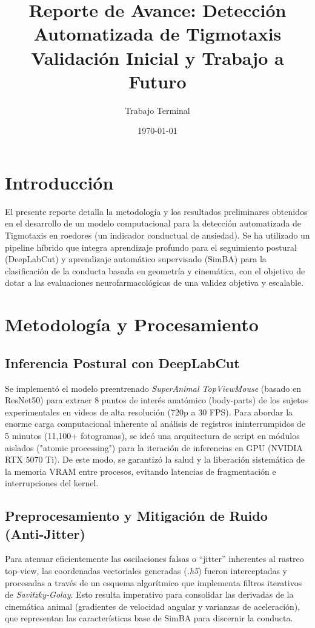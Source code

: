 \documentclass[12pt,a4paper]{article}
\title{Reporte de Avance: Detección Automatizada de Tigmotaxis \\ \large Validación Inicial y Trabajo a Futuro}
\author{Trabajo Terminal}
\date{\today}
\begin{document}
\maketitle

\section{Introducción}
El presente reporte detalla la metodología y los resultados preliminares obtenidos en el desarrollo de un modelo computacional para la detección automatizada de Tigmotaxis en roedores (un indicador conductual de ansiedad). Se ha utilizado un pipeline híbrido que integra aprendizaje profundo para el seguimiento postural (DeepLabCut) y aprendizaje automático supervisado (SimBA) para la clasificación de la conducta basada en geometría y cinemática, con el objetivo de dotar a las evaluaciones neurofarmacológicas de una validez objetiva y escalable.

\section{Metodología y Procesamiento}

\subsection{Inferencia Postural con DeepLabCut}
Se implementó el modelo preentrenado \textit{SuperAnimal TopViewMouse} (basado en ResNet50) para extraer 8 puntos de interés anatómico (body-parts) de los sujetos experimentales en videos de alta resolución (720p a 30 FPS). Para abordar la enorme carga computacional inherente al análisis de registros ininterrumpidos de 5 minutos (11,100+ fotogramas), se ideó una arquitectura de script en módulos aislados ("atomic processing") para la iteración de inferencias en GPU (NVIDIA RTX 5070 Ti). De este modo, se garantizó la salud y la liberación sistemática de la memoria VRAM entre procesos, evitando latencias de fragmentación e interrupciones del kernel.

\subsection{Preprocesamiento y Mitigación de Ruido (Anti-Jitter)}
Para atenuar eficientemente las oscilaciones falsas o ``jitter'' inherentes al rastreo top-view, las coordenadas vectoriales generadas (\textit{.h5}) fueron interceptadas y procesadas a través de un esquema algorítmico que implementa filtros iterativos de \textit{Savitzky-Golay}. Esto resulta imperativo para consolidar las derivadas de la cinemática animal (gradientes de velocidad angular y varianzas de aceleración), que representan las características base de SimBA para discernir la conducta.
\end{document}
